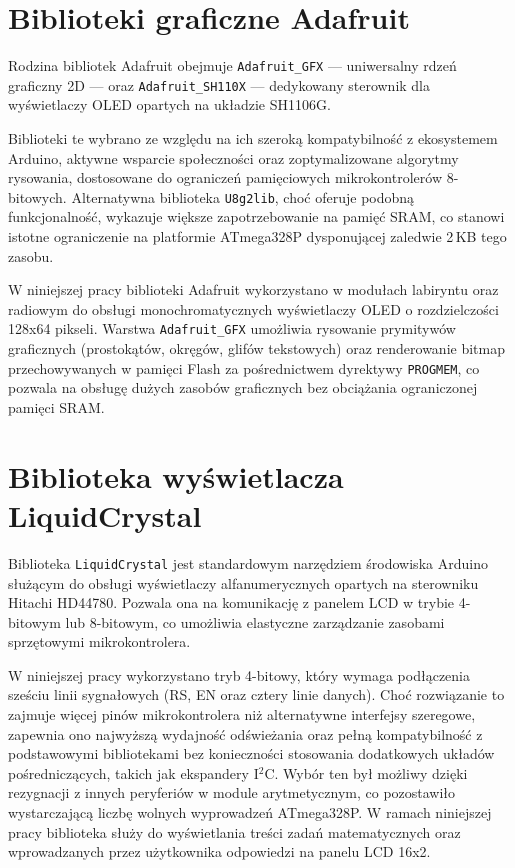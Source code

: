 \documentclass{SGGW-thesis}
\begin{document}
\section{Biblioteki graficzne Adafruit}
Rodzina bibliotek Adafruit obejmuje \texttt{Adafruit\_GFX} \cite{Adafruit-GFX-Library} --- uniwersalny rdzeń graficzny 2D --- oraz \texttt{Adafruit\_SH110X} \cite{Adafruit_sh1106x} --- dedykowany sterownik dla wyświetlaczy OLED opartych na układzie SH1106G.

Biblioteki te wybrano ze względu na ich szeroką kompatybilność z ekosystemem Arduino, aktywne wsparcie społeczności oraz zoptymalizowane algorytmy rysowania, dostosowane do ograniczeń pamięciowych mikrokontrolerów 8-bitowych. Alternatywna biblioteka \texttt{U8g2lib}, choć oferuje podobną funkcjonalność, wykazuje większe zapotrzebowanie na pamięć SRAM, co stanowi istotne ograniczenie na platformie ATmega328P dysponującej zaledwie 2\,KB tego zasobu.

W niniejszej pracy biblioteki Adafruit wykorzystano w modułach labiryntu oraz radiowym do obsługi monochromatycznych wyświetlaczy OLED o rozdzielczości 128x64 pikseli. Warstwa \texttt{Adafruit\_GFX} umożliwia rysowanie prymitywów graficznych (prostokątów, okręgów, glifów tekstowych) oraz renderowanie bitmap przechowywanych w pamięci Flash za pośrednictwem dyrektywy \texttt{PROGMEM}, co pozwala na obsługę dużych zasobów graficznych bez obciążania ograniczonej pamięci SRAM.

\section{Biblioteka wyświetlacza LiquidCrystal}
Biblioteka \texttt{LiquidCrystal} \cite{arduino_liquid_crystal} jest standardowym narzędziem środowiska Arduino służącym do obsługi wyświetlaczy alfanumerycznych opartych na sterowniku Hitachi HD44780. Pozwala ona na komunikację z panelem LCD w trybie 4-bitowym lub 8-bitowym, co umożliwia elastyczne zarządzanie zasobami sprzętowymi mikrokontrolera.

W niniejszej pracy wykorzystano tryb 4-bitowy, który wymaga podłączenia sześciu linii sygnałowych (RS, EN oraz cztery linie danych). Choć rozwiązanie to zajmuje więcej pinów mikrokontrolera niż alternatywne interfejsy szeregowe, zapewnia ono najwyższą wydajność odświeżania oraz pełną kompatybilność z podstawowymi bibliotekami bez konieczności stosowania dodatkowych układów pośredniczących, takich jak ekspandery I$^2$C. Wybór ten był możliwy dzięki rezygnacji z innych peryferiów w module arytmetycznym, co pozostawiło wystarczającą liczbę wolnych wyprowadzeń ATmega328P. W ramach niniejszej pracy biblioteka służy do wyświetlania treści zadań matematycznych oraz wprowadzanych przez użytkownika odpowiedzi na panelu LCD 16x2.
\end{document}
